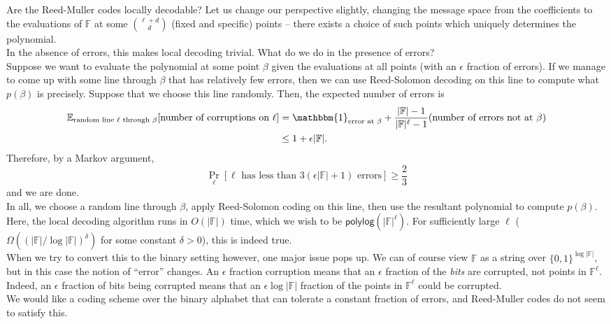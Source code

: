 \documentclass{article}
\newcommand{\E}{\mathbb{E}}
\newcommand{\F}{\mathbb{F}}
\newcommand{\indic}{\mathbbm{1}}
\newcommand{\polylog}{\mathsf{polylog}}
\begin{document}
	Are the Reed-Muller codes locally decodable? Let us change our perspective slightly, changing the message space from the coefficients to the evaluations of $\F$ at some $\binom{\ell+d}{d}$ (fixed and specific) points -- there exists a choice of such points which uniquely determines the polynomial.\\
	In the absence of errors, this makes local decoding trivial. What do we do in the presence of errors?\\
	Suppose we want to evaluate the polynomial at some point $\beta$ given the evaluations at all points (with an $\epsilon$ fraction of errors). If we manage to come up with some line through $\beta$ that has relatively few errors, then we can use Reed-Solomon decoding on this line to compute what $p(\beta)$ is precisely. Suppose that we choose this line randomly. Then, the expected number of errors is
	\begin{align*}
		\E_{\text{random line $\ell$ through $\beta$}}[\text{number of corruptions on $\ell$}] &= \indic_{\text{error at $\beta$}} + \frac{|\F|-1}{|\F|^\ell-1} (\text{number of errors not at $\beta$}) \\
			&\le 1 + \epsilon|\F|.
	\end{align*}
	Therefore, by a Markov argument,
	\[ \Pr_{\ell} [\text{$\ell$ has less than $3(\epsilon|\F|+1)$ errors}] \ge \frac{2}{3} \]
	and we are done.\\

	In all, we choose a random line through $\beta$, apply Reed-Solomon coding on this line, then use the resultant polynomial to compute $p(\beta)$.\\
	Here, the local decoding algorithm runs in $O(|\F|)$ time, which we wish to be $\polylog(|\F|^{\ell})$. For sufficiently large $\ell$ ($\Omega( (|\F|/\log|\F|)^\delta)$ for some constant $\delta > 0$), this is indeed true.\\

	When we try to convert this to the binary setting however, one major issue pops up. We can of course view $\F$ as a string over $\{0,1\}^{\log |\F|}$, but in this case the notion of ``error'' changes. An $\epsilon$ fraction corruption means that an $\epsilon$ fraction of the \emph{bits} are corrupted, not points in $\F^\ell$. Indeed, an $\epsilon$ fraction of bits being corrupted means that an $\epsilon \log|\F|$ fraction of the points in $\F^\ell$ could be corrupted. \\
	We would like a coding scheme over the binary alphabet that can tolerate a constant fraction of errors, and Reed-Muller codes do not seem to satisfy this.
\end{document}
